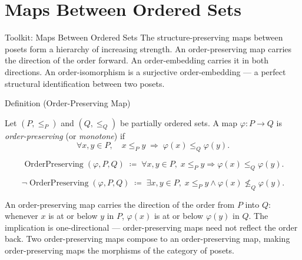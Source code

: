 
\section{Maps Between Ordered Sets}
\label{sec:maps-ordered-sets}

\begin{toolkitbox}{Toolkit: Maps Between Ordered Sets}
The structure-preserving maps between posets form a hierarchy of increasing
strength.  An order-preserving map carries the direction of the order
forward.  An order-embedding carries it in both directions.  An
order-isomorphism is a surjective order-embedding — a perfect structural
identification between two posets.
\end{toolkitbox}


\begin{definitionbox}{Definition (Order-Preserving Map)}
\begin{definition}
\label{def:order-preserving-map}
Let $(P, \leq_P)$ and $(Q, \leq_Q)$ be partially ordered sets.  A map
$\varphi : P \to Q$ is \emph{order-preserving} (or \emph{monotone}) if
\[
\forall x, y \in P, \quad
x \leq_P y \;\Longrightarrow\; \varphi(x) \leq_Q \varphi(y).
\]
\end{definition}
\end{definitionbox}

\begin{remark*}
\[
\operatorname{OrderPreserving}(\varphi, P, Q)
\;\coloneqq\;
\forall x, y \in P,\;
x \leq_P y \Rightarrow \varphi(x) \leq_Q \varphi(y).
\]
\end{remark*}

\begin{remark*}
\[
\neg\operatorname{OrderPreserving}(\varphi, P, Q)
\;\coloneqq\;
\exists x, y \in P,\;
x \leq_P y \land \varphi(x) \not\leq_Q \varphi(y).
\]
\end{remark*}

\begin{remark*}[Interpretation]
An order-preserving map carries the direction of the order from $P$ into
$Q$: whenever $x$ is at or below $y$ in $P$, $\varphi(x)$ is at or below
$\varphi(y)$ in $Q$.  The implication is one-directional — order-preserving
maps need not reflect the order back.  Two order-preserving maps compose
to an order-preserving map, making order-preserving maps the morphisms
of the category of posets.
\end{remark*}

